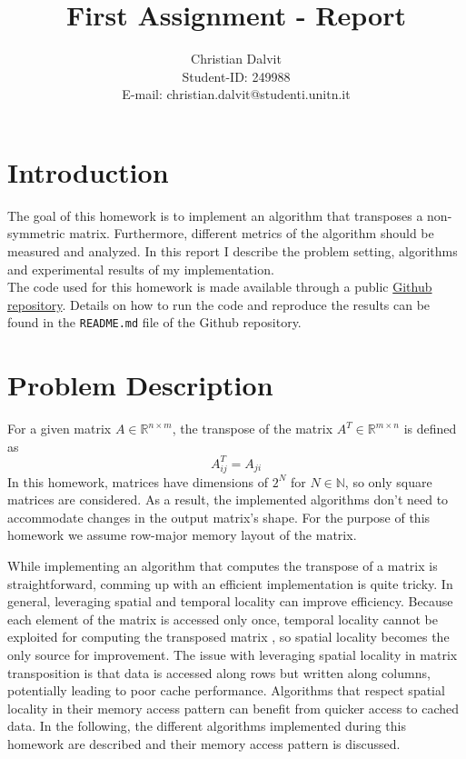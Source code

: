 \documentclass{scrartcl}
\title{First Assignment - Report}
\author{
    Christian Dalvit\\
    {\small Student-ID: 249988}\\
    {\small E-mail: christian.dalvit@studenti.unitn.it}
}
\begin{document}
    \maketitle
    \thispagestyle{empty}
    \newpage

    \setcounter{page}{1}
    \section{Introduction}    
    The goal of this homework is to implement an algorithm that transposes a non-symmetric matrix. Furthermore, different metrics of the algorithm should be measured and analyzed. In this report I describe the problem setting, algorithms and experimental results of my implementation.\\
    The code used for this homework is made available through a public \href{https://github.com/chrisdalvit/matrix-transpose-benchmark}{Github repository}. Details on how to run the code and reproduce the results can be found in the \texttt{README.md} file of the Github repository.

    \section{Problem Description}
    For a given matrix $A \in \mathbb{R}^{n \times m}$, the transpose of the matrix $A^T \in \mathbb{R}^{m \times n}$ is defined as
    $$
        A^T_{ij} = A_{ji}
    $$
    In this homework, matrices have dimensions of $2^N$ for $N \in \mathbb{N}$, so only square matrices are considered. As a result, the implemented algorithms don't need to accommodate changes in the output matrix's shape. For the purpose of this homework we assume row-major memory layout of the matrix.

    While implementing an algorithm that computes the transpose of a matrix is straightforward, comming up with an efficient implementation is quite tricky. In general, leveraging spatial and temporal locality can improve efficiency. Because each element of the matrix is accessed only once, temporal locality cannot be exploited for computing the transposed matrix \cite{chatterjee2000cache}, so spatial locality becomes the only source for improvement. The issue with leveraging spatial locality in matrix transposition is that data is accessed along rows but written along columns, potentially leading to poor cache performance. Algorithms that respect spatial locality in their memory access pattern can benefit from quicker access to cached data. In the following, the different algorithms implemented during this homework are described and their memory access pattern is discussed.
\end{document}
